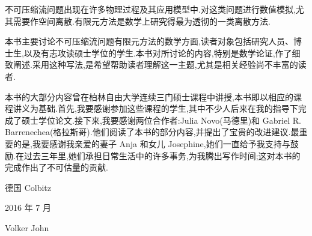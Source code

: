 不可压缩流问题出现在许多物理过程及其应用模型中.对这类问题进行数值模拟,尤其需要作空间离散.有限元方法是数学上研究得最为透彻的一类离散方法.

本书主要讨论不可压缩流问题有限元方法的数学方面,读者对象包括研究人员、博士生,以及有志攻读硕士学位的学生.本书对所讨论的内容,特别是数学论证,作了细致阐述.采用这种写法,是希望帮助读者理解这一主题,尤其是相关经验尚不丰富的读者.

本书的大部分内容曾在柏林自由大学连续三门硕士课程中讲授,本书即以相应的课程讲义为基础.首先,我要感谢参加这些课程的学生,其中不少人后来在我的指导下完成了硕士学位论文.接下来,我要感谢两位合作者:Julia Novo(马德里)和 Gabriel R. Barrenechea(格拉斯哥).他们阅读了本书的部分内容,并提出了宝贵的改进建议.最重要的是,我要感谢我亲爱的妻子 Anja 和女儿 Josephine,她们一直给予我支持与鼓励.在过去三年里,她们承担日常生活中的许多事务,为我腾出写作时间;这对本书的完成作出了不可估量的贡献.

\begin{flushright}
德国 Colbitz\par
2016 年 7 月\par
Volker John
\end{flushright}
